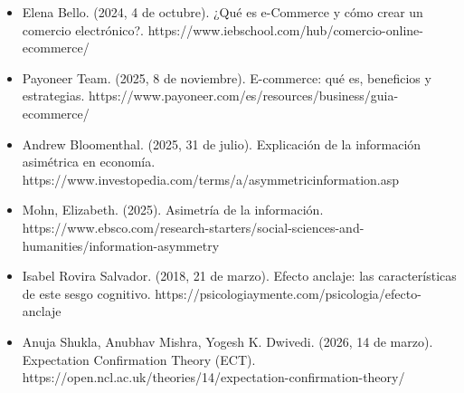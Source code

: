 \documentclass[oneside,11pt]{Latex/Classes/PhDthesisPSnPDF}
\begin{document}
\begin{itemize}
\item{Elena Bello. (2024, 4 de octubre). ¿Qué es e-Commerce y cómo crear un comercio electrónico?. https://www.iebschool.com/hub/comercio-online-ecommerce/}
\item{Payoneer Team. (2025, 8 de noviembre). E-commerce: qué es, beneficios y estrategias. https://www.payoneer.com/es/resources/business/guia-ecommerce/}
\item{Andrew Bloomenthal. (2025, 31 de julio). Explicación de la información asimétrica en economía. https://www.investopedia.com/terms/a/asymmetricinformation.asp}
\item{Mohn, Elizabeth. (2025). Asimetría de la información. https://www.ebsco.com/research-starters/social-sciences-and-humanities/information-asymmetry}
\item{Isabel Rovira Salvador. (2018, 21 de marzo). Efecto anclaje: las características de este sesgo cognitivo. https://psicologiaymente.com/psicologia/efecto-anclaje}
\item{Anuja Shukla, Anubhav Mishra, Yogesh K. Dwivedi. (2026, 14 de marzo). Expectation Confirmation Theory (ECT). https://open.ncl.ac.uk/theories/14/expectation-confirmation-theory/}
\end{itemize}

\appendix
\renewcommand{\thechapter}{\Alph{chapter}}

\renewcommand{\bibname}{Lista de Referencias}
 
 

\end{document}
